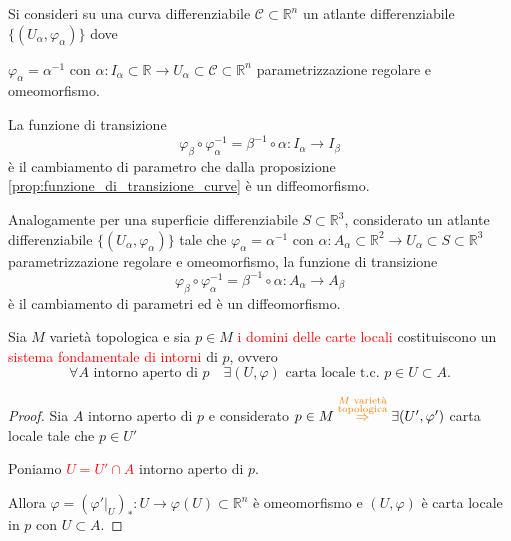         \begin{osservazione}
        \mbox{}

        Si consideri su una curva differenziabile $\mathscr{C} \subset \mathbb{R}^n$ un atlante differenziabile $\{(U_\alpha, \varphi_\alpha)\}$ dove
        
        $\varphi_\alpha = \alpha^{-1}$ con $\alpha \colon I_\alpha \subset \mathbb{R} \to U_\alpha \subset \mathscr{C} \subset \mathbb{R}^n$ parametrizzazione regolare e omeomorfismo. 
        
        La funzione di transizione
        \[
        \varphi_\beta \circ \varphi_\alpha^{-1} = \beta^{-1} \circ \alpha : I_\alpha \to I_\beta
        \]
        è il cambiamento di parametro che dalla proposizione \ref{prop:funzione_di_transizione_curve} è un diffeomorfismo.

        Analogamente per una superficie differenziabile $S \subset \mathbb{R}^3$, considerato un atlante differenziabile $\{(U_\alpha, \varphi_\alpha)\}$ tale che $\varphi_\alpha = \alpha^{-1}$ con $\alpha : A_\alpha \subset \mathbb{R}^2 \to U_\alpha \subset S \subset \mathbb{R}^3$ parametrizzazione regolare e omeomorfismo, la funzione di transizione
        \[
        \varphi_\beta \circ \varphi_\alpha^{-1} = \beta^{-1} \circ \alpha : A_\alpha \to A_\beta
        \]
        è il cambiamento di parametri ed è un diffeomorfismo.
        \end{osservazione}
        \newpage
        \begin{proposizione}
        \label{prop:varieta_topologica_domini_sistema_fondamentale_di_intorni}
        Sia $M$ varietà topologica e sia $p \in M$ \textcolor{red}{i domini delle carte locali} costituiscono un \textcolor{red}{sistema fondamentale di intorni} di $p$, ovvero
        \[
        \forall A \text{ intorno aperto di } p \quad \exists (U, \varphi) \text{ carta locale t.c. } p \in U \subset A.
        \]
        \end{proposizione}

        \begin{proof}
        \mbox{}

        Sia $A$ intorno aperto di $p$ e considerato $p \in M \textcolor{orange}{\overset{\substack{M \text{ varietà} \\  \text{ topologica }}}{\Rightarrow}} \exists (U', \varphi')$ carta locale tale che $p \in U'$

        Poniamo \textcolor{red}{$U = U' \cap A$} intorno aperto di $p$.
        
        Allora $\varphi = (\varphi'|_{U})_* : U \to \varphi(U) \subset \mathbb{R}^n$ è omeomorfismo e $(U, \varphi)$ è carta locale in $p$ con $U \subset A$.
        \end{proof}

